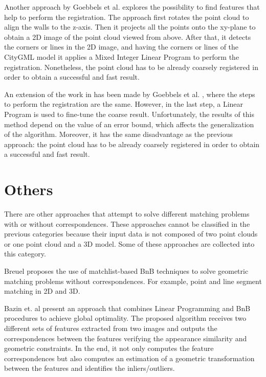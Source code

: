        Another approach by Goebbels et al. \cite{Goebbels_2018_linebased} explores the possibility to find features that help to perform the registration.
        The approach first rotates the point cloud to align the walls to the z-axis. Then it projects all the points onto the 
        xy-plane to obtain a 2D image of the point cloud viewed from above. After that, it detects the corners or lines in the 2D image,
        and having the corners or lines of the CityGML model it applies a Mixed Integer Linear Program to perform the registration.
        Nonetheless, the point cloud has to be already coarsely registered in order to obtain a successful and fast result.

        An extension of the work in \cite{Goebbels_2018_linebased} has been made by Goebbels et al. \cite{Goebbels_2018_alinear}, 
        where the steps to perform the registration are the same.
        However, in the last step, a Linear Program is used to fine-tune the coarse result. 
        Unfortunately, the results of this method depend on the value of an error bound, which affects the generalization of the algorithm.
        Moreover, it has the same disadvantage as the previous approach: 
        the point cloud has to be already coarsely registered in order to obtain a successful and fast result.

        
    \section{Others}
    There are other approaches that attempt to solve different matching problems with or without correspondences.
    These approaches cannot be classified in the previous categories because their input data is not composed of two point clouds or one point cloud and a 3D model.
    Some of these approaches are collected into this category.

    Breuel \cite{Breuel_2003_implementation} proposes the use of matchlist-based BnB techniques to solve geometric matching problems without correspondences.
    For example, point and line segment matching in 2D and 3D.

    Bazin et. al \cite{Bazin_2013_abranchandbound} present an approach that combines Linear Programming and BnB procedures to achieve global optimality.
    The proposed algorithm receives two different sets of features extracted from two images and outputs
    the correspondences between the features verifying the appearance similarity and geometric constraints.
    In the end, it not only computes the feature correspondences but also computes an estimation of a geometric transformation between the features
    and identifies the inliers/outliers.

